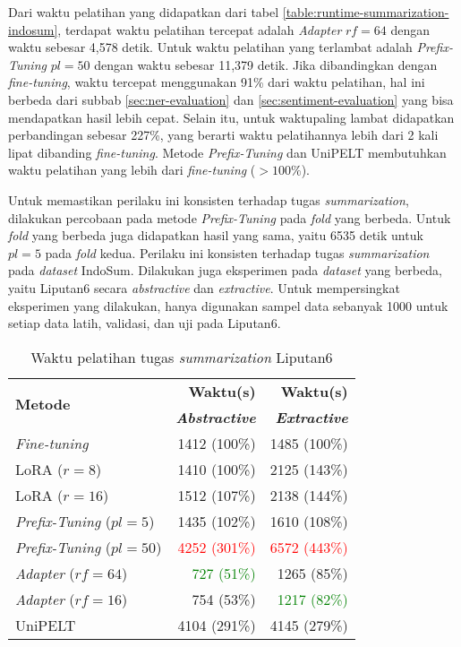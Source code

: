 Dari waktu pelatihan yang didapatkan dari tabel \ref{table:runtime-summarization-indosum}, terdapat waktu pelatihan tercepat adalah \textit{Adapter} $rf=64$ dengan waktu sebesar 4,578 detik. Untuk waktu pelatihan yang terlambat adalah \textit{Prefix-Tuning} $pl=50$ dengan waktu sebesar 11,379 detik. Jika dibandingkan dengan \textit{fine-tuning}, waktu tercepat menggunakan 91\% dari waktu pelatihan, hal ini berbeda dari subbab \ref{sec:ner-evaluation} dan \ref{sec:sentiment-evaluation} yang bisa mendapatkan hasil lebih cepat. Selain itu, untuk waktupaling lambat didapatkan perbandingan sebesar 227\%, yang berarti waktu pelatihannya lebih dari 2 kali lipat dibanding \textit{fine-tuning}. Metode \textit{Prefix-Tuning} dan UniPELT membutuhkan waktu pelatihan yang lebih dari \textit{fine-tuning} ($>100\%$). 

Untuk memastikan perilaku ini konsisten terhadap tugas \textit{summarization}, dilakukan percobaan pada metode \textit{Prefix-Tuning} pada \textit{fold} yang berbeda. Untuk \textit{fold} yang berbeda juga didapatkan hasil yang sama, yaitu 6535 detik untuk $pl=5$ pada \textit{fold} kedua. Perilaku ini konsisten terhadap tugas \textit{summarization} pada \textit{dataset} IndoSum. Dilakukan juga eksperimen pada \textit{dataset} yang berbeda, yaitu Liputan6 secara \textit{abstractive} dan \textit{extractive}. Untuk mempersingkat eksperimen yang dilakukan, hanya digunakan sampel data sebanyak 1000 untuk setiap data latih, validasi, dan uji pada Liputan6.

\begin{table}[h]
    \centering
    \caption{Waktu pelatihan tugas \textit{summarization} Liputan6}
    \label{table:runtime-summarization-liputan6}
    \begin{tabular}{l|r|r}
        \toprule
        \multirow{2}{*}{\textbf{Metode}} & \textbf{Waktu(s)}  & \textbf{Waktu(s)}  \\
                                         & \textbf{\textit{Abstractive}} & \textbf{\textit{Extractive}} \\
        \midrule
        \textit{Fine-tuning} & 1412 (100\%) & 1485 (100\%) \\
        LoRA ($r=8$) & 1410 (100\%) & 2125 (143\%) \\
        LoRA ($r=16$) & 1512 (107\%) & 2138 (144\%) \\
        \textit{Prefix-Tuning} ($pl=5$) & 1435 (102\%) & 1610 (108\%) \\
        \textit{Prefix-Tuning} ($pl=50$) & \textcolor{Red}{4252 (301\%)} & \textcolor{Red}{6572 (443\%)} \\
        \textit{Adapter} ($rf=64$) & \textcolor{Green}{727 (51\%)} & 1265 (85\%) \\
        \textit{Adapter} ($rf=16$) & 754 (53\%) & \textcolor{Green}{1217 (82\%)} \\
        UniPELT & 4104 (291\%) & 4145 (279\%) \\
        \bottomrule
    \end{tabular}
\end{table}

